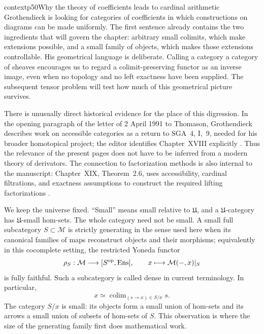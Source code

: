 \begin{dcomment}{context}{p50}{Why the theory of coefficients leads to cardinal arithmetic}
Grothendieck is looking for categories of coefficients in which constructions on diagrams can be made uniformly. The first sentence already contains the two ingredients that will govern the chapter: arbitrary small colimits, which make extensions possible, and a small family of objects, which makes those extensions controllable. His geometrical language is deliberate. Calling a category a category of sheaves encourages us to regard a colimit-preserving functor as an inverse image, even when no topology and no left exactness have been supplied. The subsequent tensor problem will test how much of this geometrical picture survives.

There is unusually direct historical evidence for the place of this digression. In the opening paragraph of the letter of 2 April 1991 to Thomason, Grothendieck describes work on accessible categories as a return to SGA~4, I,~9, needed for his broader homotopical project; the editor identifies Chapter~XVIII explicitly \citep[opening paragraph, printed p.~2]{Grothendieck1991Letter}. Thus the relevance of the present pages does not have to be inferred from a modern theory of derivators. The connection to factorization methods is also internal to the manuscript: Chapter~XIX, Theorem~2.6, uses accessibility, cardinal filtrations, and exactness assumptions to construct the required lifting factorizations \citep[ms. pp.~25--26]{Grothendieck1990XIX}.

We keep the universe fixed. ``Small'' means small relative to $\mathfrak U$, and a $\mathfrak U$-category has $\mathfrak U$-small hom-sets. The whole category need not be small. A small full subcategory $S\subset\mathcal M$ is strictly generating in the sense used here when its canonical families of maps reconstruct objects and their morphisms; equivalently in this cocomplete setting, the restricted Yoneda functor
\[
 \rho_S:\mathcal M\longrightarrow [S^{\mathrm{op}},\mathrm{Ens}],
 \qquad x\longmapsto\mathcal M(-,x)|_S
\]
is fully faithful. Such a subcategory is called dense in current terminology. In particular,
\[
 x\simeq\mathop{\mathrm{colim}}_{(s\to x)\in S/x}s.
\]
The category $S/x$ is small: its objects form a small union of hom-sets and its arrows a small union of subsets of hom-sets of $S$. This observation is where the size of the generating family first does mathematical work.


\end{dcomment}
